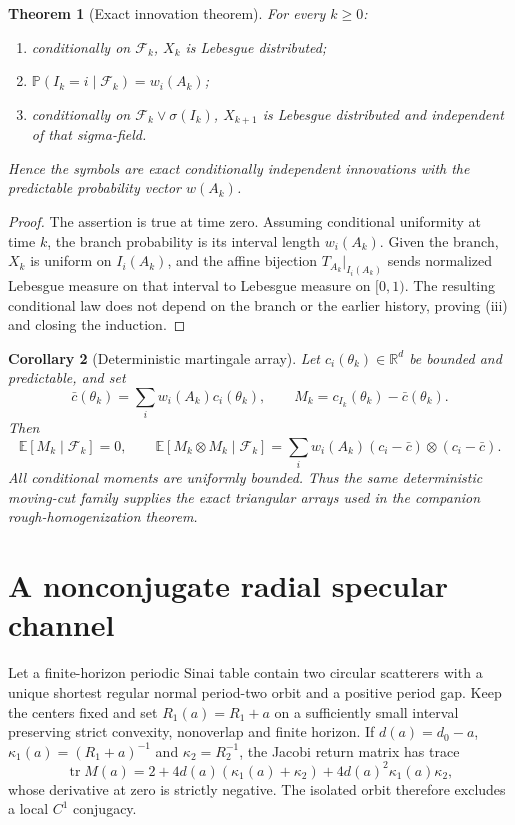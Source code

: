 \documentclass[11pt,reqno]{amsart}
\newtheorem{theorem}{Theorem}[section]
\newtheorem{corollary}[theorem]{Corollary}
\theoremstyle{definition}
\theoremstyle{remark}
\newcommand{\F}{\mathcal F}
\newcommand{\Pp}{\mathbb P}
\newcommand{\R}{\mathbb R}
\begin{document}
\begin{theorem}[Exact innovation theorem]\label{thm:innovations}
For every $k\ge0$:
\begin{enumerate}[label=(\roman*)]
\item conditionally on $\F_k$, $X_k$ is Lebesgue distributed;
\item $\Pp(I_k=i\mid\F_k)=w_i(A_k)$;
\item conditionally on $\F_k\vee\sigma(I_k)$, $X_{k+1}$ is Lebesgue
      distributed and independent of that sigma-field.
\end{enumerate}
Hence the symbols are exact conditionally independent innovations with the
predictable probability vector $w(A_k)$.
\end{theorem}

\begin{proof}
The assertion is true at time zero.  Assuming conditional uniformity at time
$k$, the branch probability is its interval length $w_i(A_k)$.  Given the
branch, $X_k$ is uniform on $I_i(A_k)$, and the affine bijection
$T_{A_k}|_{I_i(A_k)}$ sends normalized Lebesgue measure on that interval to
Lebesgue measure on $[0,1)$.  The resulting conditional law does not depend on
the branch or the earlier history, proving (iii) and closing the induction.
\end{proof}

\begin{corollary}[Deterministic martingale array]\label{cor:martingale}
Let $c_i(\theta_k)\in\R^d$ be bounded and predictable, and set
\[
 \bar c(\theta_k)=\sum_iw_i(A_k)c_i(\theta_k),
 \qquad M_k=c_{I_k}(\theta_k)-\bar c(\theta_k).
\]
Then
\[
 \mathbb E[M_k\mid\F_k]=0,
\qquad
 \mathbb E[M_k\otimes M_k\mid\F_k]
 =\sum_iw_i(A_k)(c_i-\bar c)\otimes(c_i-\bar c).
\]
All conditional moments are uniformly bounded.  Thus the same deterministic
moving-cut family supplies the exact triangular arrays used in the companion
rough-homogenization theorem.
\end{corollary}

\section{A nonconjugate radial specular channel}\label{sec:specular}

Let a finite-horizon periodic Sinai table contain two circular scatterers with
a unique shortest regular normal period-two orbit and a positive period gap.
Keep the centers fixed and set $R_1(a)=R_1+a$ on a sufficiently small interval
preserving strict convexity, nonoverlap and finite horizon.  If
$d(a)=d_0-a$, $\kappa_1(a)=(R_1+a)^{-1}$ and $\kappa_2=R_2^{-1}$, the Jacobi
return matrix has trace
\[
 \operatorname{tr}M(a)=2+4d(a)(\kappa_1(a)+\kappa_2)
 +4d(a)^2\kappa_1(a)\kappa_2,
\]
whose derivative at zero is strictly negative.  The isolated orbit therefore
excludes a local $C^1$ conjugacy.
\end{document}
